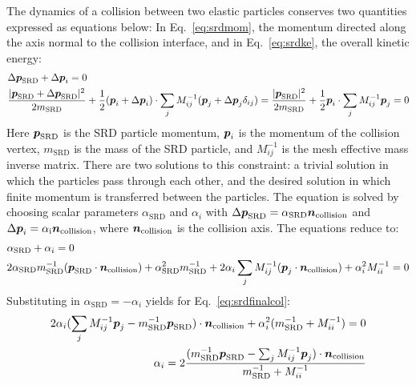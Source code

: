 The dynamics of a collision between two elastic particles conserves two quantities expressed as equations below: In Eq.~\ref{eq:srdmom}, the momentum directed along the axis normal to the collision interface, and in Eq.~\ref{eq:srdke}, the overall kinetic energy:
\begin{align}
\label{eq:srdmom}
&\Delta \boldsymbol{p}_\textrm{SRD} + \Delta \boldsymbol{p}_i = 0 \\
\label{eq:srdke}
&\frac{ |\boldsymbol{p}_\textrm{SRD} + \Delta \boldsymbol{p}_\textrm{SRD}|^2}{2 m_\textrm{SRD}} +  \frac{1}{2} (\boldsymbol{p}_i + \Delta \boldsymbol{p}_i) \cdot \sum_j M_{ij}^{-1} (\boldsymbol{p}_j + \Delta \boldsymbol{p}_j \delta_{ij}) = \frac{ |\boldsymbol{p}_\textrm{SRD}|^2}{2 m_\textrm{SRD}} + \frac{1}{2} \boldsymbol{p}_i \cdot \sum_j M_{ij}^{-1} \boldsymbol{p}_{j} = 0
\end{align}
Here $\boldsymbol{p}_\textrm{SRD}$ is the SRD particle momentum, $\boldsymbol{p}_i$ is the momentum of the collision vertex, $m_\textrm{SRD}$ is the mass of the SRD particle, and $M^{-1}_{ij}$ is the mesh effective mass inverse matrix.
There are two solutions to this constraint: a trivial solution in which the particles pass through each other, and the desired solution in which finite momentum is transferred between the particles.
The equation is solved by choosing scalar parameters $\alpha_\textrm{SRD}$ and $\alpha_i$ with $\Delta \boldsymbol{p}_\textrm{SRD} = \alpha_\textrm{SRD} \boldsymbol{n}_\textrm{collision}$ and $\Delta \boldsymbol{p}_i = \alpha_\textrm{i} \boldsymbol{n}_\textrm{collision}$, where $\boldsymbol{n}_\textrm{collision}$ is the collision axis.
The equations reduce to:
\begin{align}
&\alpha_\textrm{SRD} + \alpha_i = 0 \\
&2 \alpha_\textrm{SRD}  m^{-1}_\textrm{SRD} (\boldsymbol{p}_\textrm{SRD} \cdot \boldsymbol{n}_\textrm{collision}) + \alpha_\textrm{SRD}^2 m^{-1}_\textrm{SRD} +
\label{eq:srdfinalcol}
2 \alpha_i \sum_{j} M^{-1}_{ij} (\boldsymbol{p}_j \cdot \boldsymbol{n}_\textrm{collision})  + \alpha_i^2 M^{-1}_{ii} =0 
\end{align}
Substituting in $\alpha_\textrm{SRD}=-\alpha_i$ yields for Eq.~\ref{eq:srdfinalcol}:
\begin{align}
2 \alpha_i (\sum_j M^{-1}_{ij} \boldsymbol{p}_j - m^{-1}_\textrm{SRD} \boldsymbol{p}_\textrm{SRD})\cdot\boldsymbol{n}_\textrm{collision} + \alpha_i^2 (m_\textrm{SRD}^{-1}+M^{-1}_{ii}) = 0 \nonumber \\
\alpha_i = 2 \frac{ (m^{-1}_\textrm{SRD} \boldsymbol{p}_\textrm{SRD} - \sum_j M^{-1}_{ij} \boldsymbol{p}_j ) \cdot \boldsymbol{n}_\textrm{collision} } { m^{-1}_\textrm{SRD} + M^{-1}_{ii}}
\end{align}

